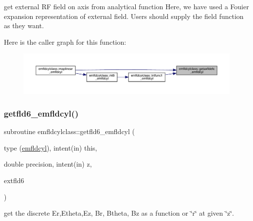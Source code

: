 get external RF field on axis from analytical function Here, we have used a Fouier expansion representation of external field. Users should supply the field function as they want. 

Here is the caller graph for this function\+:\nopagebreak
\begin{figure}[H]
\begin{center}
\leavevmode
\includegraphics[width=350pt]{namespaceemfldcylclass_a6e60352b9a6d8b289d85b9ddcc2b9336_icgraph}
\end{center}
\end{figure}
\mbox{\label{namespaceemfldcylclass_ace5420817acc583fa855b546b70f6a5e}} 
\subsubsection{\texorpdfstring{getfld6\_emfldcyl()}{getfld6\_emfldcyl()}}
{\footnotesize\ttfamily subroutine emfldcylclass\+::getfld6\+\_\+emfldcyl (\begin{DoxyParamCaption}\item[{type (\mbox{\hyperlink{namespaceemfldcylclass_structemfldcylclass_1_1emfldcyl}{emfldcyl}}), intent(in)}]{this,  }\item[{double precision, intent(in)}]{z,  }\item[{}]{extfld6 }\end{DoxyParamCaption})}



get the discrete Er,Etheta,Ez, Br, Btheta, Bz as a function or \char`\"{}r\char`\"{} at given \char`\"{}z\char`\"{}. 

\mbox{\label{namespaceemfldcylclass_a4285c0422f781555210bb16c345c3e23}} 
